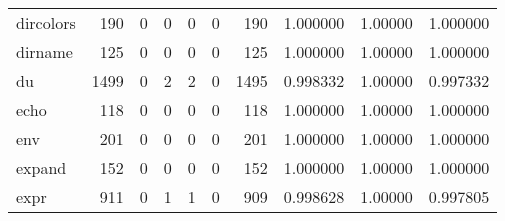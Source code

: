 \begin{longtable}{lrrrrrrrrr}
dircolors &                    190 &                                  0 &                                 0 &                                0 &                                 0 &                             190 &                                1.000000 &                                1.00000 &                             1.000000 \\
dirname   &                    125 &                                  0 &                                 0 &                                0 &                                 0 &                             125 &                                1.000000 &                                1.00000 &                             1.000000 \\
du        &                   1499 &                                  0 &                                 2 &                                2 &                                 0 &                            1495 &                                0.998332 &                                1.00000 &                             0.997332 \\
echo      &                    118 &                                  0 &                                 0 &                                0 &                                 0 &                             118 &                                1.000000 &                                1.00000 &                             1.000000 \\
env       &                    201 &                                  0 &                                 0 &                                0 &                                 0 &                             201 &                                1.000000 &                                1.00000 &                             1.000000 \\
expand    &                    152 &                                  0 &                                 0 &                                0 &                                 0 &                             152 &                                1.000000 &                                1.00000 &                             1.000000 \\
expr      &                    911 &                                  0 &                                 1 &                                1 &                                 0 &                             909 &                                0.998628 &                                1.00000 &                             0.997805 \\

\end{longtable}
